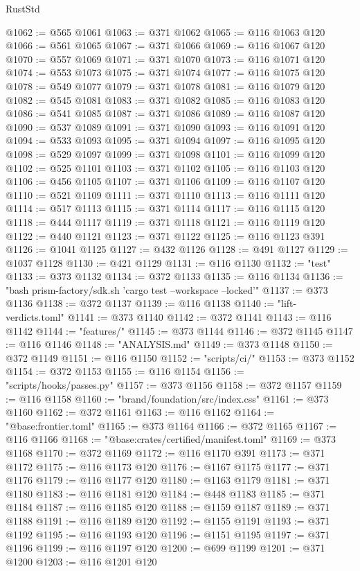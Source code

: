 \begin{lexlean}{RustStd}
\begin{coremodule}
@1062 := @565 @1061
@1063 := @371 @1062
@1065 := @116 @1063 @120
@1066 := @561 @1065
@1067 := @371 @1066
@1069 := @116 @1067 @120
@1070 := @557 @1069
@1071 := @371 @1070
@1073 := @116 @1071 @120
@1074 := @553 @1073
@1075 := @371 @1074
@1077 := @116 @1075 @120
@1078 := @549 @1077
@1079 := @371 @1078
@1081 := @116 @1079 @120
@1082 := @545 @1081
@1083 := @371 @1082
@1085 := @116 @1083 @120
@1086 := @541 @1085
@1087 := @371 @1086
@1089 := @116 @1087 @120
@1090 := @537 @1089
@1091 := @371 @1090
@1093 := @116 @1091 @120
@1094 := @533 @1093
@1095 := @371 @1094
@1097 := @116 @1095 @120
@1098 := @529 @1097
@1099 := @371 @1098
@1101 := @116 @1099 @120
@1102 := @525 @1101
@1103 := @371 @1102
@1105 := @116 @1103 @120
@1106 := @456 @1105
@1107 := @371 @1106
@1109 := @116 @1107 @120
@1110 := @521 @1109
@1111 := @371 @1110
@1113 := @116 @1111 @120
@1114 := @517 @1113
@1115 := @371 @1114
@1117 := @116 @1115 @120
@1118 := @444 @1117
@1119 := @371 @1118
@1121 := @116 @1119 @120
@1122 := @440 @1121
@1123 := @371 @1122
@1125 := @116 @1123 @391
@1126 := @1041 @1125
@1127 := @432 @1126
@1128 := @491 @1127
@1129 := @1037 @1128
@1130 := @421 @1129
@1131 := @116 @1130
@1132 := "test"
@1133 := @373 @1132
@1134 := @372 @1133
@1135 := @116 @1134
@1136 := "bash prism-factory/sdk.sh 'cargo test --workspace --locked'"
@1137 := @373 @1136
@1138 := @372 @1137
@1139 := @116 @1138
@1140 := "lift-verdicts.toml"
@1141 := @373 @1140
@1142 := @372 @1141
@1143 := @116 @1142
@1144 := "features/"
@1145 := @373 @1144
@1146 := @372 @1145
@1147 := @116 @1146
@1148 := "ANALYSIS.md"
@1149 := @373 @1148
@1150 := @372 @1149
@1151 := @116 @1150
@1152 := "scripts/ci/"
@1153 := @373 @1152
@1154 := @372 @1153
@1155 := @116 @1154
@1156 := "scripts/hooks/passes.py"
@1157 := @373 @1156
@1158 := @372 @1157
@1159 := @116 @1158
@1160 := "brand/foundation/src/index.css"
@1161 := @373 @1160
@1162 := @372 @1161
@1163 := @116 @1162
@1164 := "@base:frontier.toml"
@1165 := @373 @1164
@1166 := @372 @1165
@1167 := @116 @1166
@1168 := "@base:crates/certified/manifest.toml"
@1169 := @373 @1168
@1170 := @372 @1169
@1172 := @116 @1170 @391
@1173 := @371 @1172
@1175 := @116 @1173 @120
@1176 := @1167 @1175
@1177 := @371 @1176
@1179 := @116 @1177 @120
@1180 := @1163 @1179
@1181 := @371 @1180
@1183 := @116 @1181 @120
@1184 := @448 @1183
@1185 := @371 @1184
@1187 := @116 @1185 @120
@1188 := @1159 @1187
@1189 := @371 @1188
@1191 := @116 @1189 @120
@1192 := @1155 @1191
@1193 := @371 @1192
@1195 := @116 @1193 @120
@1196 := @1151 @1195
@1197 := @371 @1196
@1199 := @116 @1197 @120
@1200 := @699 @1199
@1201 := @371 @1200
@1203 := @116 @1201 @120

\end{coremodule}
\end{lexlean}
